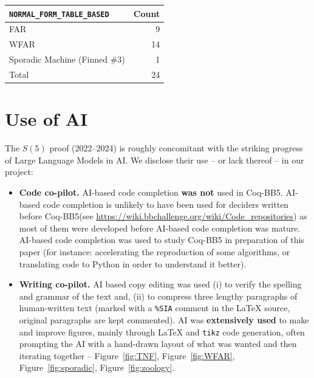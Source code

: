 \documentclass[a4paper,british]{article}
\theoremstyle{definition} %
\numberwithin{equation}{section}
\theoremstyle{definition} %
\newcommand{\CoqBB}{Coq-BB5\xspace}
\begin{document}
\begin{table}[H]
\begin{minipage}{0.35\linewidth}
\begin{tabular}{|lr|}
            \hline
            \texttt{NORMAL\_FORM\_TABLE\_BASED} & Count \\
            \hline
            FAR                                 & 9     \\
            WFAR                                & 14    \\
            Sporadic Machine (Finned \#3)       & 1     \\
            \hline
            Total                               & 24    \\
            \hline
        \end{tabular}
    \end{minipage}
\end{table}

\vspace{-1em}
\section{Use of AI}

The $S(5)$ proof (2022--2024) is roughly concomitant with the striking progress of Large Language Models in AI. We disclose their use -- or lack thereof -- in our project:

\begin{itemize}
    \item \textbf{Code co-pilot.} AI-based code completion \textbf{was not} used in \CoqBB. AI-based code completion is unlikely to have been used for deciders written before \CoqBB (see \url{https://wiki.bbchallenge.org/wiki/Code_repositories}) as most of them were developed before AI-based code completion was mature. AI-based code completion was used to study \CoqBB in preparation of this paper (for instance: accelerating the reproduction of some algorithms, or translating \Coq code to Python in order to understand it better).
    \item \textbf{Writing co-pilot.} AI based copy editing was used (i) to verify the spelling and grammar of the text and, (ii) to compress three lengthy paragraphs of human-written text (marked with a \texttt{\%SIA} comment in the LaTeX source, original paragraphs are kept commented). AI was \textbf{extensively used} to make and improve figures, mainly through LaTeX and \texttt{tikz} code generation, often prompting the AI with a hand-drawn layout of what was wanted and then iterating together -- \eg Figure~\ref{fig:TNF}, Figure~\ref{fig:WFAR}, Figure~\ref{fig:sporadic}, Figure~\ref{fig:zoology}.

\end{itemize}
\end{document}

